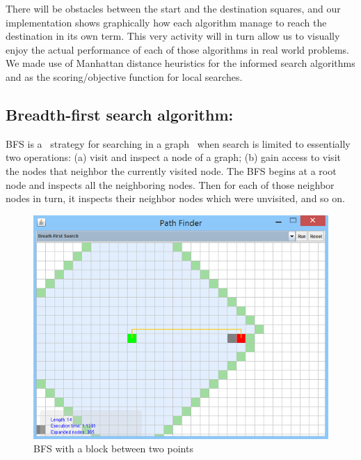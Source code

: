 \documentclass[a4paper]{article}
\begin{document}
There will be obstacles between the start and the destination squares, and our implementation shows graphically how each algorithm manage to reach the destination in its own term. This very activity will in turn allow us to visually enjoy the actual performance of each of those algorithms in real world problems. We made use of Manhattan distance heuristics for the informed search algorithms and as the scoring/objective function for local searches.


\subsection{Breadth-first search algorithm:}

BFS is a  strategy for searching in a graph  when search is limited to essentially two operations: (a) visit and inspect a node of a graph; (b) gain access to visit the nodes that neighbor the currently visited node. The BFS begins at a root node and inspects all the neighboring nodes. Then for each of those neighbor nodes in turn, it inspects their neighbor nodes which were unvisited, and so on. \\

\begin{figure}[h!]
  \centering
    \includegraphics[scale=.9]{images/bfs1.png}
  \caption{BFS with a block between two points}
\end{figure}
\end{document}
